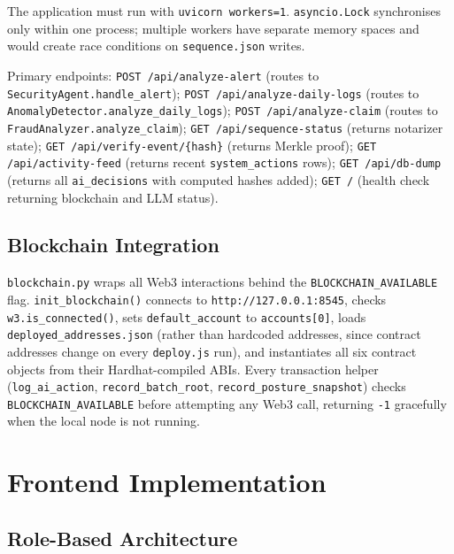 \documentclass[12pt,a4paper]{article}
\begin{document}
The application must run with \texttt{uvicorn workers=1}.
\texttt{asyncio.Lock} synchronises only within one process; multiple
workers have separate memory spaces and would create race conditions
on \texttt{sequence.json} writes.

Primary endpoints: \texttt{POST /api/analyze-alert} (routes to
\texttt{SecurityAgent.handle\_alert}); \texttt{POST /api/analyze-daily-logs}
(routes to \texttt{AnomalyDetector.analyze\_daily\_logs});
\texttt{POST /api/analyze-claim} (routes to
\texttt{FraudAnalyzer.analyze\_claim}); \texttt{GET /api/sequence-status}
(returns notarizer state); \texttt{GET /api/verify-event/\{hash\}}
(returns Merkle proof); \texttt{GET /api/activity-feed} (returns
recent \texttt{system\_actions} rows); \texttt{GET /api/db-dump}
(returns all \texttt{ai\_decisions} with computed hashes added);
\texttt{GET /} (health check returning blockchain and LLM status).

\subsection{Blockchain Integration}
\label{sec:blockchain-py}

\texttt{blockchain.py} wraps all Web3 interactions behind the
\texttt{BLOCKCHAIN\_AVAILABLE} flag. \texttt{init\_blockchain()} connects
to \texttt{http://127.0.0.1:8545}, checks \texttt{w3.is\_connected()},
sets \texttt{default\_account} to \texttt{accounts[0]}, loads
\texttt{deployed\_addresses.json} (rather than hardcoded addresses,
since contract addresses change on every \texttt{deploy.js} run), and
instantiates all six contract objects from their Hardhat-compiled ABIs.
Every transaction helper (\texttt{log\_ai\_action},
\texttt{record\_batch\_root}, \texttt{record\_posture\_snapshot}) checks
\texttt{BLOCKCHAIN\_AVAILABLE} before attempting any Web3 call, returning
\texttt{-1} gracefully when the local node is not running.

\section{Frontend Implementation}
\label{sec:frontend}

\subsection{Role-Based Architecture}
\label{sec:role-based}
\end{document}

